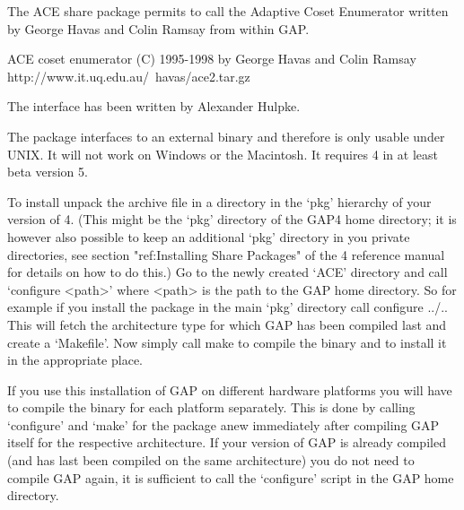 

The ACE share package permits to call the Adaptive Coset Enumerator written
by George Havas and Colin Ramsay from within GAP. 

\begintt
ACE coset enumerator (C) 1995-1998 by George Havas and Colin Ramsay
    http://www.it.uq.edu.au/~havas/ace2.tar.gz
\endtt

The {\GAP} interface has been written by Alexander Hulpke.

The package interfaces to an external binary and therefore is only usable
under UNIX. It will not work on Windows or the Macintosh. It requires
{\GAP}4 in at least beta version 5.


To install unpack the archive file in a directory in the `pkg' hierarchy of
your version of {\GAP}4. (This might be the `pkg' directory of the
GAP4 home directory; it is however also possible to keep an additional `pkg'
directory in you private directories, see section "ref:Installing Share
Packages" of the {\GAP}4 reference manual for details on how to do this.)
Go to the newly created `ACE' directory and call `configure <path>' where
<path> is the path to the GAP home directory. So for example if you install
the package in the main `pkg' directory call
\begintt
configure ../..
\endtt
This will fetch the architecture type for which GAP has been compiled last
and create a `Makefile'. 
Now simply call
\begintt
make
\endtt
to compile the binary and to install it in the appropriate place.

If you use this installation of GAP on different hardware platforms you will
have to compile the binary for each platform separately. This is done by
calling `configure' and `make' for the package anew immediately after
compiling GAP itself for the respective architecture.
If your version of GAP is already compiled (and has last been compiled on
the same architecture) you do not need to compile GAP
again, it is sufficient to call the `configure' script in the GAP home
directory.

